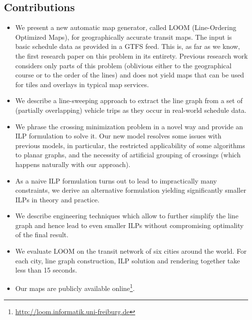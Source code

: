 \documentclass[format=acmsmall, review=false, screen=true]{acmart}
\begin{document}
\subsection{Contributions}\label{SEC:intro:contrib}
\begin{itemize}[parsep=0.5mm,leftmargin=4mm]
\renewcommand\labelitemi{$\bullet$}
\item We present a new automatic map generator, called LOOM (Line-Ordering Optimized Maps), for geographically accurate transit maps. The input is basic schedule data as provided in a GTFS feed.
 This is, as far as we know, the first research paper on this problem in its entirety. Previous research work considers only parts of this problem (oblivious either to the geographical course or to the order of the lines) and does not yield maps that can be used for tiles and overlays in typical map services.

\item We describe a line-sweeping approach to extract the line graph from a set of (partially overlapping) vehicle trips as they occur in real-world schedule data.
\item We phrase the crossing minimization problem in a novel way and provide an ILP formulation to solve it. Our new model resolves some issues with previous models, in particular, the restricted applicability of some algorithms to planar graphs, and the necessity of artificial grouping of crossings (which happens naturally with our approach).

\item As a naive ILP formulation turns out to lead to impractically many constraints, we derive an alternative formulation yielding significantly smaller ILPs in theory and practice.

\item We describe engineering techniques which allow to further simplify the line graph and hence lead to even smaller ILPs without compromising optimality of the final result.

\item We evaluate LOOM on the transit network of six cities around the world.
For each city, line graph construction, ILP solution and rendering together take less than 15 seconds.

\item Our maps are publicly available online\footnote{\url{http://loom.informatik.uni-freiburg.de}}.
\end{itemize}
\end{document}
